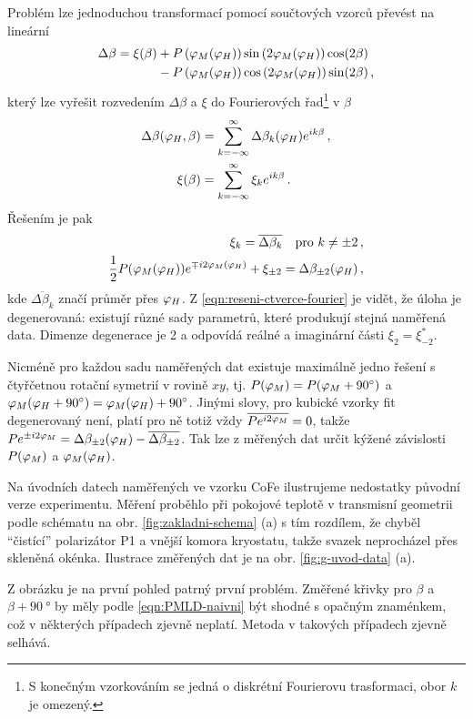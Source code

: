 Problém lze jednoduchou transformací pomocí součtových vzorců převést na lineární
\begin{align}
\label{eqn:PMLD-linearizovane}
\Delta\beta =\xi(\beta) &+ P\left(\varphi_M(\varphi_H)\right)\sin\left(2\varphi_M(\varphi_H)\right)\cos(2\beta) 
           \\&-P\left(\varphi_M(\varphi_H)\right)\cos\left(2\varphi_M(\varphi_H)\right)\sin(2\beta) \,,
\end{align}
který lze vyřešit rozvedením $\Delta\beta$ a $\xi$ do Fourierových řad\footnote{S konečným vzorkováním se jedná o diskrétní Fourierovu trasformaci, obor $k$ je omezený.} v $\beta$
\begin{align}
    \Delta\beta(\varphi_H, \beta) &= \sum_{k=-\infty}^\infty \Delta\beta_k(\varphi_H) e^{ik\beta} \,,\\
    \xi(\beta) &= \sum_{k=-\infty}^\infty \xi_k e^{ik\beta}  \,.
\end{align}
Řešením je pak
\begin{align}
    \xi_k = \overline{\Delta\beta_{k}} \quad \textrm{pro} \,\, k\neq\pm2 \,,\\
    \frac{1}{2}P(\varphi_M(\varphi_H)) e^{\mp i2\varphi_M(\varphi_H)} + \xi_{\pm2} = \Delta\beta_{\pm2}(\varphi_H) \,,\label{eqn:reseni-ctverce-fourier}
\end{align}
kde $\overline{\Delta\beta_k}$ značí průměr přes $\varphi_H$.
Z \eqref{eqn:reseni-ctverce-fourier} je vidět, že úloha je degenerovaná: existují různé sady parametrů, které produkují stejná naměřená data.
Dimenze degenerace je 2 a odpovídá reálné a imaginární části $\xi_2=\xi_{-2}^*$.

Nicméně pro každou sadu naměřených dat existuje maximálně jedno řešení s čtyřčetnou rotační symetrií v rovině $xy$, tj. $P(\varphi_M)=P(\varphi_M+\SI{90}{\degree})$ a $\varphi_M(\varphi_H+\SI{90}{\degree})=\varphi_M(\varphi_H)+\SI{90}{\degree}$.
Jinými slovy, pro kubické vzorky fit degenerovaný není, platí pro ně totiž vždy $\overline{Pe^{i2\varphi_M}}=0$, takže $Pe^{\pm i2\varphi_M}=\Delta\beta_{\pm2}(\varphi_H)-\overline{\Delta\beta_{\pm2}}$.
Tak lze z měřených dat určit kýžené závislosti $P(\varphi_M)$ a $\varphi_M(\varphi_H)$.

Na úvodních datech naměřených ve vzorku CoFe ilustrujeme nedostatky původní verze experimentu.
Měření proběhlo při pokojové teplotě v transmisní geometrii podle schématu na obr. \ref{fig:zakladni-schema} (a) s tím rozdílem, že chyběl ``čistící'' polarizátor P1 a vnější komora kryostatu, takže svazek neprocházel přes skleněná okénka.
Ilustrace změřených dat je na obr. \ref{fig:g-uvod-data} (a).

Z obrázku je na první pohled patrný první problém.
Změřené křivky pro $\beta$ a $\beta+\SI{90}{\degree}$ by měly podle \eqref{eqn:PMLD-naivni} být shodné s opačným znaménkem, což v některých případech zjevně neplatí.
Metoda v takových případech zjevně selhává.

